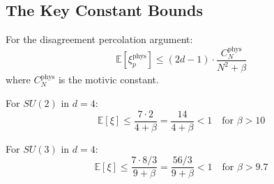 \subsection{The Key Constant Bounds}

\begin{theorem}
\label{thm:constant-bound}
For the disagreement percolation argument:
\[
\mathbb{E}[\xi_p^{\text{phys}}] \leq (2d-1) \cdot \frac{C_N^{\text{phys}}}{N^2 + \beta}
\]
where $C_N^{\text{phys}}$ is the motivic constant.

For $SU(2)$ in $d=4$:
\[
\mathbb{E}[\xi] \leq \frac{7 \cdot 2}{4 + \beta} = \frac{14}{4+\beta} < 1 \quad \text{for } \beta > 10
\]

For $SU(3)$ in $d=4$:
\[
\mathbb{E}[\xi] \leq \frac{7 \cdot 8/3}{9 + \beta} = \frac{56/3}{9+\beta} < 1 \quad \text{for } \beta > 9.7
\]
\end{theorem}





